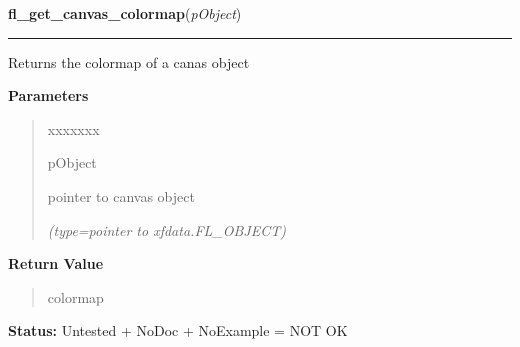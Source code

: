 \hspace{.8\funcindent}\begin{boxedminipage}{\funcwidth}

    \raggedright \textbf{fl\_get\_canvas\_colormap}(\textit{pObject})

    \vspace{-1.5ex}

    \rule{\textwidth}{0.5\fboxrule}
\setlength{\parskip}{2ex}
    Returns the colormap of a canas object

\setlength{\parskip}{1ex}
      \textbf{Parameters}
      \vspace{-1ex}

      \begin{quote}
        \begin{Ventry}{xxxxxxx}

          \item[pObject]

          pointer to canvas object

            {\it (type=pointer to xfdata.FL\_OBJECT)}

        \end{Ventry}

      \end{quote}

      \textbf{Return Value}
    \vspace{-1ex}

      \begin{quote}
      colormap

      \end{quote}

\textbf{Status:} Untested + NoDoc + NoExample = NOT OK



    \end{boxedminipage}

    \label{xformslib:library:fl_get_canvas_depth}

    \vspace{0.5ex}

